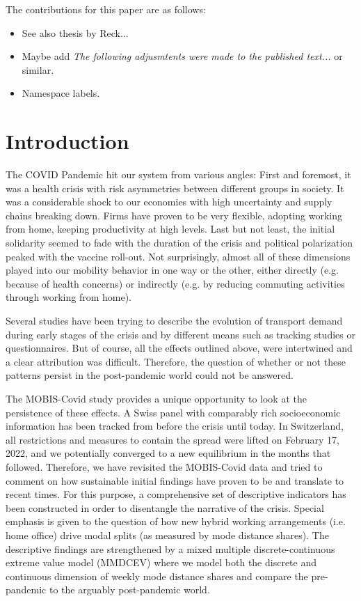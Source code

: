 \documentclass[%
    twoside, openright, titlepage, numbers=noenddot,%
    cleardoublepage=empty,%
    abstract=false,%
    BCOR=5.5mm, paper=a5, fontsize=10pt,%
]{mythesis}
\begin{document}
The contributions for this paper are as follows:

\begin{leftbar}
\begin{itemize}
\item See also thesis by Reck...
\item Maybe add \emph{The following adjusmtents were made to the published text...} or similar.
\item Namespace labels.
\end{itemize}
\end{leftbar}

\section{Introduction}
\label{sec:introduction}

The COVID Pandemic hit our system from various angles: First and foremost, it was a health crisis with risk asymmetries between different groups in society. It was a considerable shock to our economies with high uncertainty and supply chains breaking down. Firms have proven to be very flexible, adopting working from home, keeping productivity at high levels. Last but not least, the initial solidarity seemed to fade with the duration of the crisis and political polarization peaked with the vaccine roll-out. Not surprisingly, almost all of these dimensions played into our mobility behavior in one way or the other, either directly (e.g. because of health concerns) or indirectly (e.g. by reducing commuting activities through working from home).

Several studies have been trying to describe the evolution of transport demand during early stages of the crisis and by different means such as tracking studies or questionnaires. But of course, all the effects outlined above, were intertwined and a clear attribution was difficult. Therefore, the question of whether or not these patterns persist in the post-pandemic world could not be answered.

The MOBIS-Covid study \citep{Molloy+Etal:2022} provides a unique opportunity to look at the persistence of these effects. A Swiss panel with comparably rich socioeconomic information has been tracked from before the crisis until today. In Switzerland, all restrictions and measures to contain the spread were lifted on February 17, 2022, and we potentially converged to a new equilibrium in the months that followed. Therefore, we have revisited the MOBIS-Covid data and tried to comment on how sustainable initial findings have proven to be and translate to recent times. For this purpose, a comprehensive set of descriptive indicators has been constructed in order to disentangle the narrative of the crisis. Special emphasis is given to the question of how new hybrid working arrangements (i.e. home office) drive modal splits (as measured by mode distance shares). The descriptive findings are strengthened by a mixed multiple discrete-continuous extreme value model (MMDCEV) where we model both the discrete and continuous dimension of weekly mode distance shares and compare the pre-pandemic to the arguably post-pandemic world.
\end{document}

